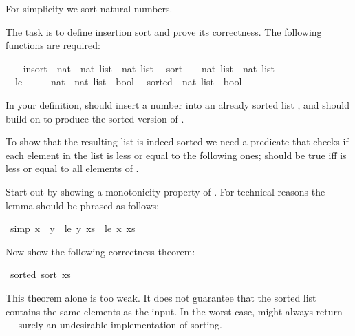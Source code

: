 %
\begin{isabellebody}%
\def\isabellecontext{a{\isadigit{2}}}%
\isamarkupfalse%
%
\isamarkuptrue%
%
\begin{isamarkuptext}%
For simplicity we sort natural numbers.%
\end{isamarkuptext}%
\isamarkuptrue%
%
\isamarkuptrue%
%
\begin{isamarkuptext}%
The task is to define insertion sort and prove its correctness.
The following functions are required:%
\end{isamarkuptext}%
\isamarkuptrue%
\ \isanewline
\ \ insort\ {\isacharcolon}{\isacharcolon}\ {\isachardoublequote}nat\ {\isasymRightarrow}\ nat\ list\ {\isasymRightarrow}\ nat\ list{\isachardoublequote}\isanewline
\ \ sort\ \ \ {\isacharcolon}{\isacharcolon}\ {\isachardoublequote}nat\ list\ {\isasymRightarrow}\ nat\ list{\isachardoublequote}\isanewline
\ \ le\ \ \ \ \ {\isacharcolon}{\isacharcolon}\ {\isachardoublequote}nat\ {\isasymRightarrow}\ nat\ list\ {\isasymRightarrow}\ bool{\isachardoublequote}\isanewline
\ \ sorted\ {\isacharcolon}{\isacharcolon}\ {\isachardoublequote}nat\ list\ {\isasymRightarrow}\ bool{\isachardoublequote}\isamarkupfalse%
%
\begin{isamarkuptext}%
In your definition,  should insert a
number  into an already sorted list , and  should build on  to produce the sorted
version of .

To show that the resulting list is indeed sorted we need a predicate
 that checks if each element in the list is less or equal
to the following ones;  should be true iff
 is less or equal to all elements of .

Start out by showing a monotonicity property of .
For technical reasons the lemma should be phrased as follows:%
\end{isamarkuptext}%
\isamarkuptrue%
\ {\isacharbrackleft}simp{\isacharbrackright}{\isacharcolon}\ {\isachardoublequote}x\ {\isasymle}\ y\ {\isasymLongrightarrow}\ le\ y\ xs\ {\isasymlongrightarrow}\ le\ x\ xs{\isachardoublequote}\isamarkupfalse%
\isamarkupfalse%
%
\begin{isamarkuptext}%
Now show the following correctness theorem:%
\end{isamarkuptext}%
\isamarkuptrue%
\ {\isachardoublequote}sorted\ {\isacharparenleft}sort\ xs{\isacharparenright}{\isachardoublequote}\isamarkupfalse%
\isamarkupfalse%
%
\begin{isamarkuptext}%
This theorem alone is too weak. It does not guarantee that the
sorted list contains the same elements as the input. In the worst
case,  might always return \isa{{\isacharbrackleft}{\isacharbrackright}} --- surely an
undesirable implementation of sorting.


\end{isamarkuptext}
\end{isabellebody}
